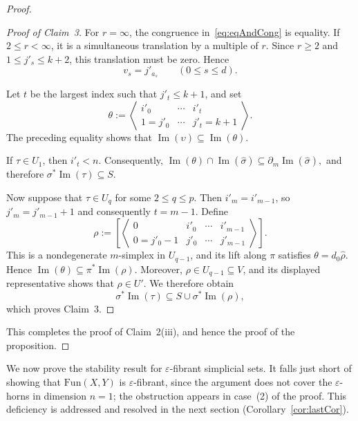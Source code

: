 \documentclass{article}
\theoremstyle{plain}
\theoremstyle{definition}
\theoremstyle{remark}
\begin{document}
\begin{proof}
\begin{proof}[Proof of Claim~3]
For $r=\infty$, the congruence in~\eqref{eq:eqAndCong} is
equality. If $2\leq r<\infty$, it is a simultaneous translation
by a multiple of $r$. Since $r\geq2$
and $1\leq j'_s\leq k+2$, this translation must be zero.
Hence
\[
v_s=j'_{a_s}\qquad(0\leq s\leq d).
\]

Let $t$ be the largest index such that $j'_t\leq k+1$, and set
\[
\theta:=
\left\langle
\begin{matrix}
i'_0&\cdots&i'_t\\
1=j'_0&\cdots&j'_t=k+1
\end{matrix}
\right\rangle.
\]
The preceding equality shows that
$\operatorname{Im}(\upsilon)\subseteq\operatorname{Im}(\theta)$.

If $\tau\in U_1$, then $i'_t<n$. Consequently,
\(
\operatorname{Im}(\theta)\cap
\operatorname{Im}(\hat{\sigma})
\subseteq\partial_m\operatorname{Im}(\hat{\sigma}),
\)
and therefore
$\sigma^*\operatorname{Im}(\tau)\subseteq S$.

Now suppose that $\tau\in U_q$ for some $2\leq q\leq p$.
Then $i'_m=i'_{m-1}$, so $j'_m=j'_{m-1}+1$ and consequently
$t=m-1$. Define
\[
\rho:=
\left[
\left\langle
\begin{matrix}
0&i'_0&\cdots&i'_{m-1}\\
0=j'_0-1&j'_0&\cdots&j'_{m-1}
\end{matrix}
\right\rangle
\right].
\]
This is a nondegenerate $m$-simplex in $U_{q-1}$, and its lift
along $\pi$ satisfies $\theta=d_0\hat{\rho}$. Hence
\(
\operatorname{Im}(\theta)
\subseteq\pi^*\operatorname{Im}(\rho).
\)
Moreover, $\rho\in U_{q-1}\subseteq V$, and its displayed
representative shows that $\rho\in U'$. We therefore obtain
\[
\sigma^*\operatorname{Im}(\tau)
\subseteq S\cup\sigma^*\operatorname{Im}(\rho),
\]
which proves Claim~3.
\end{proof}
This completes the proof of Claim~2(iii), and hence the proof of
the proposition.
\end{proof}

We now prove the stability result for $\varepsilon$-fibrant simplicial sets.
It falls just short of showing that $\mathrm{Fun}(X,Y)$ is $\varepsilon$-fibrant,
since the argument does not cover the $\varepsilon$-horns in dimension
$n=1$; the obstruction appears in case~(2) of the proof.
This deficiency is addressed and resolved in the next section (Corollary~\ref{cor:lastCor}).
\end{document}
